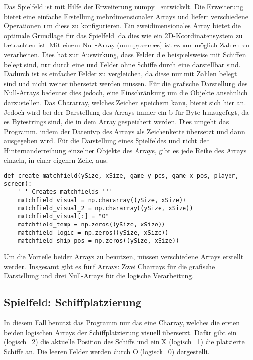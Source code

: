 \documentclass{llncs}
\begin{document}
Das Spielfeld ist mit Hilfe der Erweiterung numpy~\cite{Numpy} entwickelt. Die Erweiterung bietet eine einfache Erstellung mehrdimensionaler Arrays und liefert verschiedene Operationen um diese zu konfigurieren.
Ein zweidimensionales Array bietet die optimale Grundlage für das Spielfeld, da dies wie ein 2D-Koordinatensystem zu betrachten ist.
Mit einem Null-Array (numpy.zeroes) ist es nur möglich Zahlen zu verarbeiten. Dies hat zur Auswirkung, dass Felder die beispielsweise mit Schiffen belegt sind, nur durch eine \grqq{} und Felder ohne Schiffe durch eine \grqq{} darstellbar sind.
Dadurch ist es einfacher Felder zu vergleichen, da diese nur mit Zahlen belegt sind und nicht weiter übersetzt werden müssen. Für die grafische Darstellung des Null-Arrays bedeutet dies jedoch, eine Einschränkung um die
Objekte ansehnlich darzustellen. 
Das Chararray, welches Zeichen speichern kann, bietet sich hier an. Jedoch wird bei der Darstellung des Arrays immer ein \glqq b\grqq{} für Byte hinzugefügt, da es Bytestrings sind, die in dem Array gespeichert werden. 
Dies umgeht das Programm, indem der Datentyp des Arrays als Zeichenkette übersetzt und dann ausgegeben wird. Für die Darstellung eines Spielfeldes und nicht der Hinternanderreihung einzelner Objekte des Arrays, gibt es jede Reihe des 
Arrays einzeln, in einer eigenen Zeile, aus.

\lstset{
caption=Funktion erstellt zweidimensionale Arrays}
\begin{lstlisting}
def create_matchfield(ySize, xSize, game_y_pos, game_x_pos, player, screen):
    ''' Creates matchfields '''
    matchfield_visual = np.chararray((ySize, xSize))
    matchfield_visual_2 = np.chararray((ySize, xSize))
    matchfield_visual[:] = "O"
    matchfield_temp = np.zeros((ySize, xSize))
    matchfield_logic = np.zeros((ySize, xSize))
    matchfield_ship_pos = np.zeros((ySize, xSize))
\end{lstlisting}

Um die Vorteile beider Arrays zu benutzen, müssen verschiedene Arrays erstellt werden. Insgesamt gibt es fünf Arrays: Zwei Charrays für die grafische Darstellung und drei Null-Arrays für die logische Verarbeitung.

\subsection{Spielfeld: Schiffplatzierung}

In diesem Fall benutzt das Programm nur das eine Charray, welches die ersten beiden logischen Arrays der Schiffplatzierung visuell übersetzt. Dafür gibt ein \glqq *\grqq{} (logisch=2) die aktuelle Position des Schiffs und ein \glqq X\grqq{} (logisch=1)
die platzierte Schiffe an. Die leeren Felder werden durch \glqq O\grqq{} (logisch=0) dargestellt.
\end{document}
